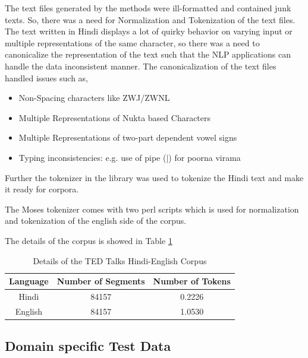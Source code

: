 The text files generated by the methods were ill-formatted and contained junk texts. So, there was a need for Normalization and Tokenization of the text files. The text written in Hindi displays a lot of quirky behavior on varying input or multiple representations of the same character, so there was a need to canonicalize the representation of the text such that the NLP applications can handle the data inconsistent manner. The canonicalization of the text files handled issues such as,
\begin{itemize}
\item Non-Spacing characters like ZWJ/ZWNL
\item Multiple Representations of Nukta based Characters
\item Multiple Representations of two-part dependent vowel signs
\item Typing inconsistencies: e.g. use of pipe ($|$) for poorna virama 
\end{itemize}

Further the tokenizer in the library was used to tokenize the Hindi text and make it ready for corpora.

The Moses tokenizer comes with two perl scripts  which  is used for normalization and tokenization of the english side of the corpus.

The details of the corpus is showed in Table \ref{corpustable} 

\begin{table}[h!]
\centering
 \begin{tabular}{ |ccc| } 
  \hline Language & Number of Segments & Number of Tokens \\ 
  \hline  Hindi &  84157 & 0.2226\\
  English & 84157 & 1.0530\\
  \hline
 \end{tabular}
\caption{Details of the TED Talks Hindi-English Corpus}
\label{corpustable}
\end{table}

\subsection{Domain specific Test Data}
